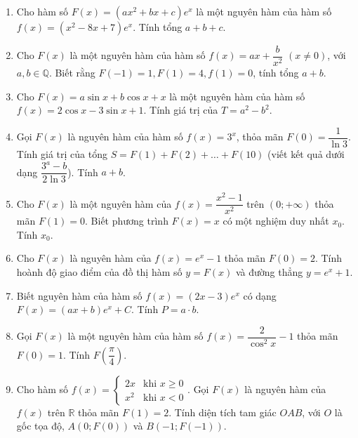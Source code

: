\documentclass[12pt]{article}
\begin{document}
\begin{enumerate}[label=\textbf{Câu \arabic*.}, start=1]
		
		\item Cho hàm số $F(x) = (ax^2 + bx + c)e^x$ là một nguyên hàm của hàm số $f(x) = (x^2 - 8x + 7)e^x$. Tính tổng $a + b + c$.
		
		
		\item Cho $F(x)$ là một nguyên hàm của hàm số $f(x) = ax + \dfrac{b}{x^2}$ $(x \neq 0)$, với $a, b \in \mathbb{Q}$. Biết rằng $F(-1) = 1, F(1) = 4, f(1) = 0$, tính tổng $a + b$.
		
		
		\item Cho $F(x) = a\sin x + b\cos x + x$ là một nguyên hàm của hàm số $f(x) = 2\cos x - 3\sin x + 1$. Tính giá trị của $T = a^2 - b^2$.
		
		
		\item Gọi $F(x)$ là nguyên hàm của hàm số $f(x) = 3^x$, thỏa mãn $F(0) = \dfrac{1}{\ln 3}$. Tính giá trị của tổng $S = F(1) + F(2) + \dots + F(10)$ (viết kết quả dưới dạng $\dfrac{3^a - b}{2\ln 3}$). Tính $a + b$.
		
		
		\item Cho $F(x)$ là một nguyên hàm của $f(x) = \dfrac{x^2 - 1}{x^2}$ trên $(0; +\infty)$ thỏa mãn $F(1) = 0$. Biết phương trình $F(x) = x$ có một nghiệm duy nhất $x_0$. Tính $x_0$.
		
		
		\item Cho $F(x)$ là nguyên hàm của $f(x) = e^x - 1$ thỏa mãn $F(0) = 2$. Tính hoành độ giao điểm của đồ thị hàm số $y = F(x)$ và đường thẳng $y = e^x + 1$.
		
		
		\item Biết nguyên hàm của hàm số $f(x) = (2x - 3)e^x$ có dạng $F(x) = (ax + b)e^x + C$. Tính $P = a \cdot b$.
		
		
		\item Gọi $F(x)$ là một nguyên hàm của hàm số $f(x) = \dfrac{2}{\cos^2 x} - 1$ thỏa mãn $F(0) = 1$. Tính $F\left(\dfrac{\pi}{4}\right)$.
		
		
		\item Cho hàm số $f(x) = \begin{cases} 2x & \text{khi } x \ge 0 \\ x^2 & \text{khi } x < 0 \end{cases}$. Gọi $F(x)$ là nguyên hàm của $f(x)$ trên $\mathbb{R}$ thỏa mãn $F(1) = 2$. Tính diện tích tam giác $OAB$, với $O$ là gốc tọa độ, $A(0; F(0))$ và $B(-1; F(-1))$.
		

\end{enumerate}
\end{document}
